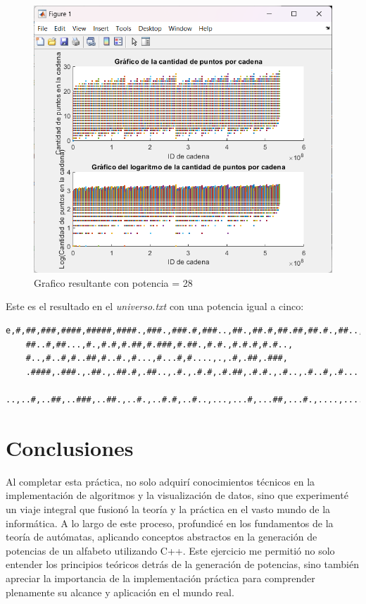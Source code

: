 \documentclass{article}
\begin{document}
\begin{figure}[H]
    \centering
    \includegraphics[width=1\linewidth]{Grafico Doble.png}
    \caption{Grafico resultante con potencia = 28}\label{graficaDoble}
\end{figure}

Este es el resultado en el \textit{universo.txt} con una potencia igual a cinco:
\begin{lstlisting}[language={},basicstyle=\ttfamily\footnotesize, breaklines=true]
    e,#,##,###,####,#####,####.,###.,###.#,###..,##.,##.#,##.##,##.#.,##..,
    ##..#,##...,#.,#.#,#.##,#.###,#.##.,#.#.,#.#.#,#.#..,
    #..,#..#,#..##,#..#.,#...,#...#,#....,.,.#,.##,.###,
    .####,.###.,.##.,.##.#,.##..,.#.,.#.#,.#.##,.#.#.,.#..,.#..#,.#...
    ..,..#,..##,..###,..##.,..#.,..#.#,..#..,...,...#,...##,...#.,....,....#,.....
\end{lstlisting}


\section{Conclusiones}
Al completar esta práctica, no solo adquirí conocimientos técnicos en la implementación de algoritmos y la visualización de datos, sino
que experimenté un viaje integral que fusionó la teoría y la práctica en el vasto mundo de la informática. A lo largo de este proceso,
profundicé en los fundamentos de la teoría de autómatas, aplicando conceptos abstractos en la generación de potencias de un alfabeto
utilizando C++. Este ejercicio me permitió no solo entender los principios teóricos detrás de la generación de potencias, sino también
apreciar la importancia de la implementación práctica para comprender plenamente su alcance y aplicación en el mundo real.
\end{document}
